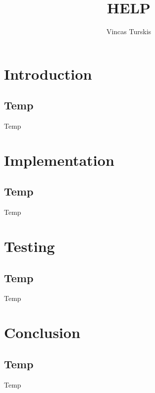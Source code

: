 \documentclass[11pt,a4paper]{report}
\author{Vincas Turskis}
\title{HELP}
\begin{document}
\tableofcontents
\chapter{Introduction}
\section{Temp}
Temp





\chapter{Implementation}
\section{Temp}
Temp

\chapter{Testing}
\section{Temp}
Temp

\chapter{Conclusion}
\section{Temp}
Temp

\printbibliography
\end{document}
